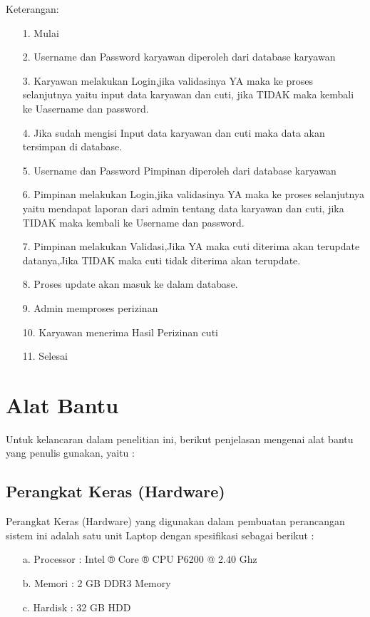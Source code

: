 \documentclass{jtetiproposalskripsi}
\begin{document}
Keterangan:
\begin{itemize}
\item[1.]Mulai
\item[2.]Username dan Password karyawan diperoleh dari database karyawan
\item[3.]Karyawan melakukan Login,jika validasinya YA maka ke proses selanjutnya yaitu input data karyawan 		 dan cuti, jika TIDAK maka kembali ke Uasername dan password.
\item[4.]Jika sudah mengisi Input data karyawan dan cuti maka data akan tersimpan di database.
\item[5.]Username dan Password Pimpinan diperoleh dari database karyawan
\item[6.]Pimpinan melakukan Login,jika validasinya YA maka ke proses selanjutnya yaitu mendapat laporan 			 dari admin tentang data karyawan dan cuti, jika TIDAK maka kembali ke Username dan password.
\item[7.]Pimpinan melakukan Validasi,Jika YA maka cuti diterima akan terupdate datanya,Jika TIDAK maka  			 cuti tidak diterima akan terupdate.
\item[8.]Proses update akan masuk ke dalam database.
\item[9.]	Admin memproses perizinan
\item[10.]	Karyawan menerima Hasil Perizinan cuti
\item[11.]	Selesai
\end{itemize}

\section{Alat Bantu}

Untuk kelancaran dalam penelitian ini, berikut penjelasan mengenai alat bantu yang penulis gunakan, yaitu : 
\subsection{Perangkat Keras (Hardware)}
Perangkat Keras (Hardware) yang digunakan dalam pembuatan perancangan  sistem ini adalah satu unit Laptop     dengan spesifikasi sebagai berikut : 
\begin{itemize}
\item[a.] Processor : Intel ® Core ® CPU 
               P6200 @ 2.40 Ghz 
\item[b.] Memori : 2 GB DDR3 Memory 
\item[c.] Hardisk : 32 GB HDD 
\end{itemize}
\end{document}
